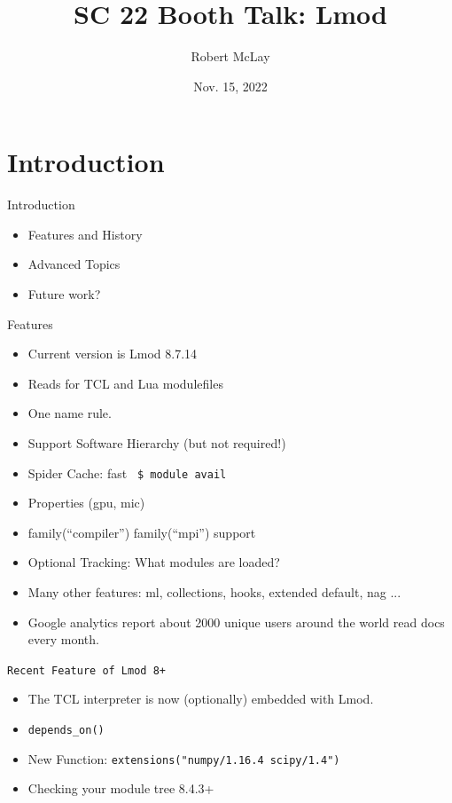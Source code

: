 \documentclass{beamer}
\begin{document}
\title[Lmod]{SC 22 Booth Talk: Lmod}
\author{Robert McLay} 
\date{Nov. 15, 2022}

\frame{\titlepage} 

\section{Introduction}

\begin{frame}{Introduction}
  \begin{itemize}
    \item Features and History
    \item Advanced Topics
    \item Future work?
  \end{itemize}
\end{frame}

\begin{frame}{Features}
  \begin{itemize}
    \item Current version is Lmod 8.7.14
    \item Reads for TCL and Lua modulefiles
    \item One name rule.
    \item Support Software Hierarchy (but not required!)
    \item Spider Cache: fast \texttt{\color{blue} \$ module avail}
    \item Properties (gpu, mic)
    \item family(``compiler'') family(``mpi'') support
    \item Optional Tracking: What modules are loaded?
    \item Many other features: ml, collections, hooks,
      extended default, nag ...
    \item Google analytics report about 2000 unique users around the
      world read docs every month.
  \end{itemize}
\end{frame}

\begin{frame}{\texttt{Recent Feature of Lmod 8+}}
  \begin{itemize}
    \item The TCL interpreter is now (optionally) embedded with Lmod.
    \item \texttt{depends\_on()}
    \item New Function: \texttt{extensions("numpy/1.16.4 scipy/1.4")}
    \item Checking your module tree 8.4.3+
  \end{itemize}
\end{frame}
\end{document}
